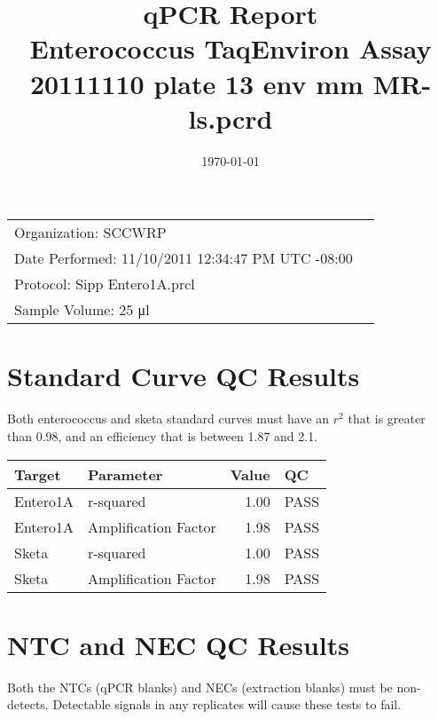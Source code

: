 \documentclass{article}\usepackage[]{graphicx}\usepackage[]{color}
\title{qPCR Report \\ Enterococcus TaqEnviron Assay \\ 20111110 plate 13 env mm MR-ls.pcrd} %
\date{\today} %
\author{}
\begin{document}
\maketitle

\begin{center}
\begin{tabular}{l r}
Organization: SCCWRP \\
Date Performed: 11/10/2011 12:34:47 PM UTC -08:00 \\ %
Protocol: Sipp Entero1A.prcl \\
Sample Volume: 25 \si{\micro\litre}
\end{tabular}
\end{center}


\section{Standard Curve QC Results}

Both enterococcus and sketa standard curves must have an $r^2$ that is greater than 0.98,
and an efficiency that is between 1.87 and 2.1. \\

\begin{table}[ht]
\centering
\begin{tabular}{llrl}
  \hline
Target & Parameter & Value & QC \\ 
  \hline
Entero1A & r-squared & 1.00 & PASS \\ 
  Entero1A & Amplification Factor & 1.98 & PASS \\ 
  Sketa & r-squared & 1.00 & PASS \\ 
  Sketa & Amplification Factor & 1.98 & PASS \\ 
   \hline
\end{tabular}
\end{table}



\section{NTC and NEC QC Results}

Both the NTCs (qPCR blanks) and NECs (extraction blanks) must be non-detects. Detectable signals
in any replicates will cause these tests to fail. \\
\end{document}
